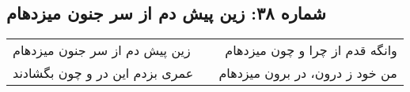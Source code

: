\begin{center}
\section*{شماره ۳۸: زین پیش دم از سر جنون میزدهام}
\label{sec:038}
\begin{longtable}{l p{0.5cm} r}
زین پیش دم از سر جنون میزدهام
&&
وانگه قدم از چرا و چون میزدهام
\\
عمری بزدم این در و چون بگشادند
&&
من خود ز درون، در برون میزدهام
\\
\end{longtable}
\end{center}
